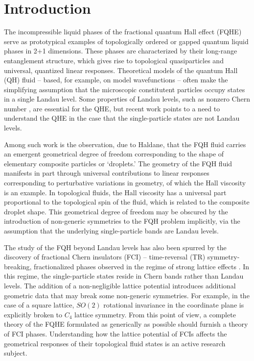 \documentclass[aps,prb,twocolumn,letterpaper,twoside,nobalancelastpage,groupedaddress,amsmath,amssymb,floatfix,citeautoscript]{revtex4-1}
\begin{document}

\maketitle

\section{Introduction}
The incompressible liquid phases of the fractional quantum Hall effect (FQHE) serve as prototypical examples of topologically ordered or gapped quantum liquid phases\cite{yoshioka_quantum_2002,fradkin_field_2013} in 2+1 dimensions. These phases are characterized by their long-range entanglement structure, which gives rise to topological quasiparticles and universal, quantized linear responses. Theoretical models of the quantum Hall (QH) fluid -- based, for example, on model wavefunctions \cite{laughlin_anomalous_1983} -- often make the simplifying assumption that the microscopic constitutent particles occupy states in a single Landau level. Some properties of Landau levels, such as nonzero Chern number \cite{thouless_quantized_1982}, are essential for the QHE, but recent work points to a need to understand the QHE in the case that the single-particle states are not Landau levels.

Among such work is the observation, due to Haldane, that the FQH fluid carries an emergent geometrical degree of freedom\cite{haldane_geometrical_2011} corresponding to the shape of elementary composite particles or `droplets.' \cite{johri_probing_2016} The geometry of the FQH fluid manifests in part through universal contributions to linear responses corresponding to perturbative variations in geometry, of which the Hall viscosity\cite{avron_viscosity_1995,tokatly_lorentz_2007,read_non-abelian_2009,haldane_hall_2009} is an example. In topological fluids, the Hall viscosity has a universal part proportional to the topological spin of the fluid\cite{read_non-abelian_2009}, which is related to the composite droplet shape.\cite{johri_probing_2016} This geometrical degree of freedom may be obscured by the introduction of non-generic symmetries to the FQH problem implicitly, via the assumption that the underlying single-particle bands are Landau levels.

The study of the FQH beyond Landau levels has also been spurred by the discovery of fractional Chern insulators (FCI) -- time-reversal (TR) symmetry-breaking, fractionalized phases observed in the regime of strong lattice effects \cite{Bergholtz:2013ue,parameswaran_fractional_2013}. In this regime, the single-particle states reside in Chern bands rather than Landau levels. The addition of a non-negligible lattice potential introduces additional geometric data that may break some non-generic symmetries. For example, in the case of a square lattice, $SO(2)$ rotational invariance in the coordinate plane is explicitly broken to $C_4$ lattice symmetry. From this point of view, a complete theory of the FQHE formulated as generically as possible should furnish a theory of FCI phases. Understanding how the lattice potential of FCIs affects the geometrical responses of their topological fluid states is an active research subject. \cite{shapourian_viscoelastic_2015}
\end{document}
